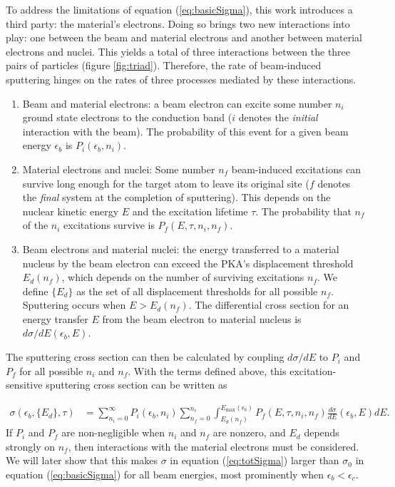 \documentclass[twoside,twocolumn,9pt]{article}
\begin{document}
To address the limitations of equation (\ref{eq:basicSigma}), this work
introduces a third party: the material's electrons.
Doing so brings two new interactions into play: one between the beam and
material electrons and another between material electrons and nuclei.
This yields a total of three interactions between the three pairs of particles
(figure \ref{fig:triad}).
Therefore, the rate of beam-induced sputtering hinges on the rates of three
processes mediated by these interactions.

\begin{enumerate}
  \item Beam and material electrons:
    a beam electron can excite some number $n_i$ ground state electrons to the
    conduction band ($i$ denotes the \textit{initial} interaction with the
    beam).
    The probability of this event for a given beam energy $\epsilon_b$ is
    $P_i(\epsilon_b, n_i)$.
  \item Material electrons and nuclei:
    Some number $n_f$ beam-induced excitations can survive long enough for the
    target atom to leave its original site ($f$ denotes the \textit{final}
    system at the completion of sputtering).
    This depends on the nuclear kinetic energy $E$ and the excitation lifetime
    $\tau$.
    The probability that $n_f$ of the $n_i$ excitations survive is $P_f(E,
    \tau, n_i, n_f)$.
  \item Beam electrons and material nuclei: the energy transferred to a
    material nucleus by the beam electron can exceed the PKA's displacement
    threshold $E_d(n_f)$, which depends on the number of surviving excitations
    $n_f$.  We define $\{{E}_d\}$ as the set of all displacement thresholds for
    all possible $n_f$.  Sputtering occurs when $E>E_d(n_f)$.  The differential
    cross section for an energy transfer $E$ from the beam electron to
    material nucleus is $d\sigma/dE(\epsilon_b, E)$.
\end{enumerate}

\noindent
The sputtering cross section can then be calculated by coupling $d\sigma/dE$ to
$P_i$ and $P_f$ for all possible $n_i$ and $n_f$.
With the terms defined above, this excitation-sensitive sputtering cross
section can be written as

\begin{equation}
  \begin{aligned}
    \sigma(\epsilon_b, \{{E}_d\}, \tau)
    &=
    \sum_{n_i=0}^\infty
    P_i(\epsilon_b, n_i)
    \sum_{n_f=0}^{n_i}
    \int_{E_d(n_f)}^{E_\text{max}(\epsilon_b)}
    P_f(E, \tau, n_i, n_f)
    \frac{d\sigma}{dE}(\epsilon_b, E)
    dE.
  \end{aligned}
  \label{eq:totSigma}
\end{equation}
%
If $P_i$ and $P_f$ are non-negligible when $n_i$ and $n_f$ are nonzero, and
$E_d$ depends strongly on $n_f$, then interactions with the material electrons
must be considered.
We will later show that this makes $\sigma$ in equation (\ref{eq:totSigma})
larger than $\sigma_0$ in equation (\ref{eq:basicSigma}) for all beam energies,
most prominently when $\epsilon_b < \epsilon_c$.
\end{document}
